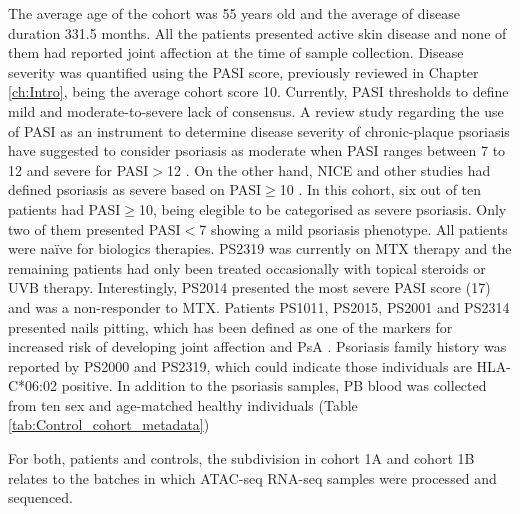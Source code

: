 \bigskip %


The average age of the cohort was 55 years old and the average of disease duration 331.5 months. All the patients presented active skin disease and none of them had reported joint affection at the time of sample collection. Disease severity was quantified using the PASI score, previously reviewed in Chapter \ref{ch:Intro}, being the average cohort score 10. Currently,  PASI thresholds to define mild and moderate-to-severe lack of consensus. A review study regarding the use of PASI as an instrument to determine disease severity of chronic-plaque psoriasis have suggested to consider psoriasis as moderate when PASI ranges between 7 to 12 and severe for PASI$>$12 \parencite{Schmitt2005}. On the other hand, NICE and other studies had defined psoriasis as severe based on PASI$\geq$10 \parencite{Woolacott2006, Finlay2005}. In this cohort, six out of ten patients had PASI$\geq$10, being elegible to be categorised as severe psoriasis. Only two of them presented PASI$<$7 showing a mild psoriasis phenotype. All patients were na\"{i}ve for biologics therapies. PS2319 was currently on MTX therapy and the remaining patients had only been treated occasionally with topical steroids or UVB therapy. Interestingly, PS2014 presented the most severe PASI score (17) and was a non-responder to MTX. Patients PS1011, PS2015, PS2001 and PS2314 presented nails pitting, which has been defined as one of the markers for increased risk of developing joint affection and PsA \parencite{Moll1976,Griffiths2007,McGonagle,2011}. Psoriasis family history was reported by PS2000 and PS2319, which could indicate those individuals are HLA-C*06:02 positive. In addition to the psoriasis samples, PB blood was collected from ten sex and age-matched healthy individuals (Table \ref{tab:Control_cohort_metadata})

For both, patients and controls, the subdivision in cohort 1A and cohort 1B relates to the batches in which ATAC-seq RNA-seq samples were processed and sequenced.


